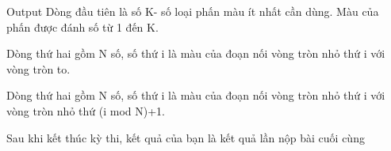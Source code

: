 Output
Dòng đầu tiên là số K- số loại phấn màu ít nhất cần dùng. Màu của phấn được đánh số từ 1 đến K.  

   Dòng thứ hai gồm N số, số thứ i là màu của đoạn nối vòng tròn nhỏ thứ i với vòng tròn to.  

   Dòng thứ hai gồm N số, số thứ i là màu của đoạn nối vòng tròn nhỏ thứ i với vòng tròn nhỏ thứ (i mod N)+1.  

    Sau khi kết thúc kỳ thi, kết quả của bạn là kết quả lần nộp bài cuối cùng